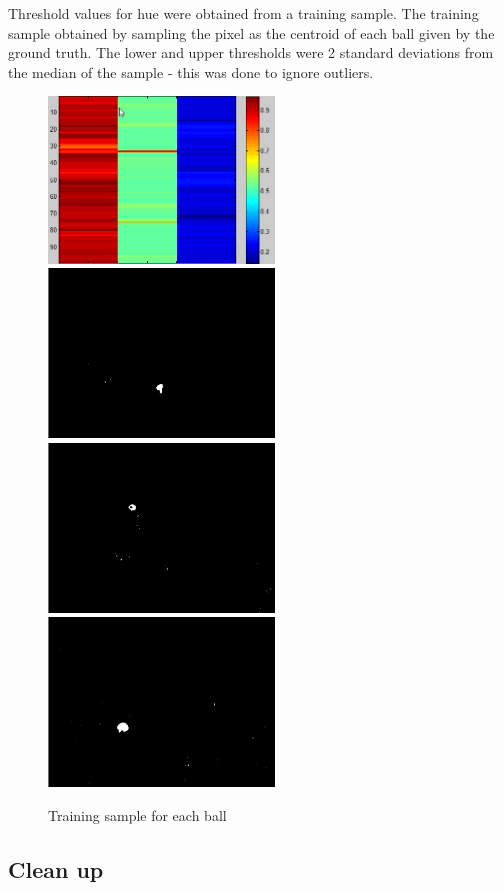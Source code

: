 \documentclass[10pt,a4paper,oneclumn]{article}
\begin{document}
Threshold values for hue were obtained from a training sample. The training sample obtained by sampling the pixel as the centroid of each ball given by the ground truth. The lower and upper thresholds were 2 standard deviations from the median of the sample - this was done to ignore outliers.

\begin{figure}
\centering
  \includegraphics[width=6cm]{figures/training.png}
  \includegraphics[width=6cm]{figures/class1.png}
  \includegraphics[width=6cm]{figures/class2.png}
  \includegraphics[width=6cm]{figures/class3.png}
\caption{Training sample for each ball}
\end{figure}

\subsection{Clean up}
\end{document}
